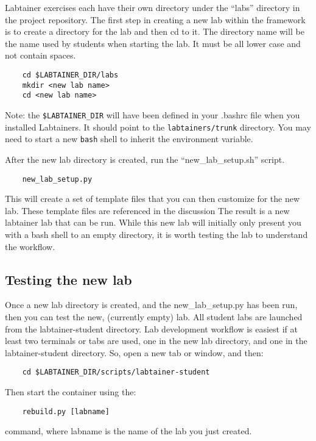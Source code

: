 \documentclass[12pt]{article}
\begin{document}
Labtainer exercises each have their own
directory under the ``labs'' directory in the project repository.
The first step in creating a new lab within the framework is to create
a directory for the lab and then cd to it.  The directory name will be the name
used by students when starting the lab.  It must be all lower case and not contain spaces.
\begin{verbatim}
    cd $LABTAINER_DIR/labs
    mkdir <new lab name>
    cd <new lab name>
\end{verbatim}
\noindent Note: the {\tt \$LABTAINER\_DIR} will have been defined in your .bashrc
file when you installed Labtainers.  It should point to the {\tt labtainers/trunk}
directory.  You may need to start a new {\tt bash} shell to inherit the environment
variable.

After the new lab directory is created, run the ``new\_lab\_setup.sh'' script.
\begin{verbatim}
    new_lab_setup.py
\end{verbatim}
This will create a set of template files that you can then customize
for the new lab.  These template files are referenced in the discussion
The result is a new labtainer lab that can be run.  While this new
lab will initially only present you with a bash shell to an
empty directory, it is worth testing the lab to understand the workflow.

\subsection{Testing the new lab}
Once a new lab directory is created, and the new\_lab\_setup.py has been run, then 
you can test the new, (currently empty) lab.  All student labs are launched from the
labtainer-student directory.  Lab development workflow is easiest if at least two
terminals or tabs are used, one in the new lab directory, and one in the labtainer-student
directory.  So, open a new tab or window, and then:

\begin{verbatim}
    cd $LABTAINER_DIR/scripts/labtainer-student
\end{verbatim}
Then start the container using the:

\begin{verbatim}
    rebuild.py [labname] 
\end{verbatim}
command, where labname is the name of the lab you just created.  
\end{document}
